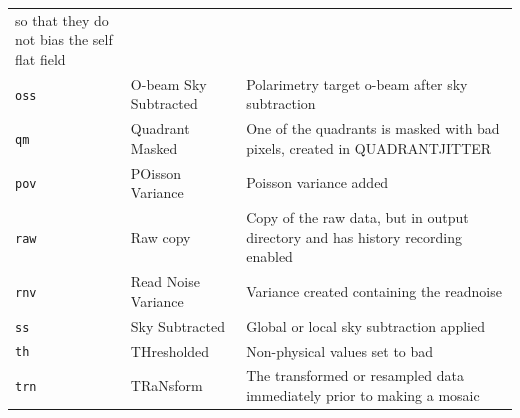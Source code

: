 \documentclass[twoside,11pt]{article}
\renewcommand{\_}{\texttt{\symbol{95}}}
\begin{document}
\begin{tabular}{llp{90mm}}
                                 so that they do not bias the self flat field \\
{\tt\_oss} & O-beam Sky Subtracted & Polarimetry target o-beam after sky subtraction \\
{\tt\_qm}  & Quadrant Masked   & One of the quadrants is masked with bad
                                 pixels, created in QUADRANT\_JITTER \\
{\tt\_pov} & POisson Variance  & Poisson variance added \\
{\tt\_raw} & Raw copy          & Copy of the raw data, but in output directory
                                 and has history recording enabled \\
{\tt\_rnv} & Read Noise Variance & Variance created containing the readnoise \\
{\tt\_ss}  & Sky Subtracted    & Global or local sky subtraction applied \\
{\tt\_th}  & THresholded       & Non-physical values set to bad \\
{\tt\_trn} & TRaNsform         & The transformed or resampled data immediately 
                                 prior to making a mosaic \\
\end{tabular}
\end{document}
